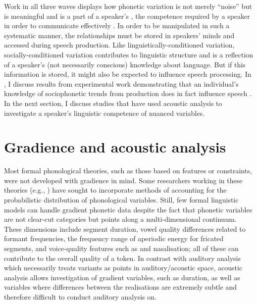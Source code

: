 
Work in all three waves displays how phonetic variation is not merely ``noise'' but is meaningful and is a part of a speaker's , the competence required by a speaker in order to communicate effectively \citep{hymes1972}. In order to be manipulated in such a systematic manner, the relationships must be stored in speakers' minds and accessed during speech production. Like linguistically-conditioned variation, socially-conditioned variation contributes to linguistic structure and is a reflection of a speaker's (not necessarily conscious) knowledge about language. But if this information is stored, it might also be expected to influence speech processing. In , I discuss results from experimental work demonstrating that an individual's knowledge of sociophonetic trends from production does in fact influence speech . In the next section, I discuss studies that have used acoustic analysis to investigate a speaker's linguistic competence of nuanced variables.


\section{Gradience and acoustic analysis}\label{sec:acoustic}
Most formal phonological theories, such as those based on features or constraints, were not developed with gradience in mind. Some researchers working in these theories (e.g., \citealt{boersma1997}) have sought to incorporate methods of accounting for the probabilistic distribution of phonological variables. Still, few formal linguistic models can handle gradient phonetic data despite the fact that phonetic variables are not clear-cut categories but points along a multi-dimensional continuum. These dimensions include segment duration, vowel quality differences related to formant frequencies, the frequency range of aperiodic energy for fricated segments, and voice-quality features such as  and nasalisation; all of these can contribute to the overall quality of a token. In contrast with auditory analysis which necessarily treats variants as points in auditory/acoustic space, acoustic analysis allows investigation of gradient variables, such as duration, as well as variables where differences between the realisations are extremely subtle and therefore difficult to conduct auditory analysis on.   

